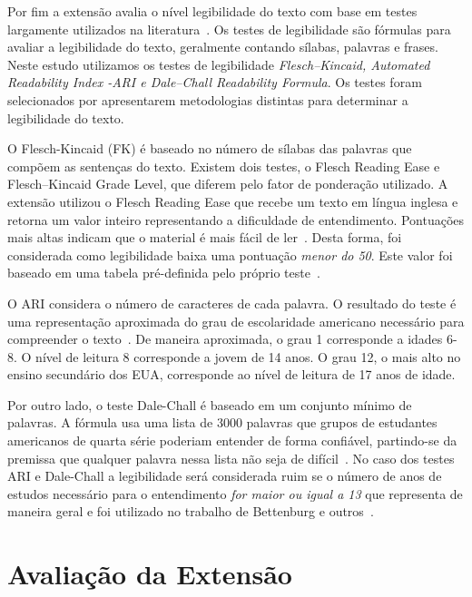 Por fim a extensão avalia o nível legibilidade do texto com base em testes
largamente utilizados na literatura~\cite{Si:2001:SMS:502585.502695}. Os testes
de legibilidade são fórmulas para avaliar a legibilidade do texto, geralmente
contando sílabas, palavras e frases.  Neste estudo utilizamos os testes de
legibilidade \textit{Flesch–Kincaid, Automated Readability Index \@-\@ ARI e
    Dale–Chall Readability Formula}. Os testes foram selecionados por
apresentarem metodologias distintas para determinar a legibilidade do texto.

O Flesch-Kincaid (FK) é baseado no número de sílabas das palavras que compõem as
sentenças do texto. Existem dois testes, o Flesch Reading Ease e Flesch–Kincaid
Grade Level, que diferem pelo fator de ponderação utilizado. A extensão utilizou
o Flesch Reading Ease que recebe um texto em língua inglesa e retorna um valor
inteiro representando a dificuldade de entendimento. Pontuações mais altas
indicam que o material é mais fácil de ler~\cite{kincaid1975derivation}. Desta
forma, foi considerada como legibilidade baixa uma pontuação \textit{menor do
    50}. Este valor foi baseado em uma tabela pré-definida pelo próprio
teste~\cite{kincaid1975derivation}.

O ARI considera o número de caracteres de cada palavra. O resultado do teste é
uma representação aproximada do grau de escolaridade americano necessário para
compreender o texto~\cite{senter1967automated}. De maneira aproximada, o grau 1
corresponde a idades 6\@-\@8. O nível de leitura 8 corresponde a jovem de 14
anos. O grau 12, o mais alto no ensino secundário dos EUA, corresponde ao nível
de leitura de 17 anos de idade.

Por outro lado, o teste Dale-Chall é baseado em um conjunto mínimo de palavras.
A fórmula usa uma lista de 3000 palavras que grupos de estudantes americanos de
quarta série poderiam entender de forma confiável, partindo-se da premissa que
qualquer palavra nessa lista não seja de difícil~\cite{dale1948formula}. No caso
dos testes ARI e Dale-Chall a legibilidade será considerada ruim se o número de
anos de estudos necessário para o entendimento \textit{for maior ou igual a 13}
que representa de maneira geral e foi utilizado no trabalho de Bettenburg e
outros~\cite{bettenburg2008makes}.

\section{Avaliação da Extensão}
\label{sec:avaliando_a_extensao_proposta}

